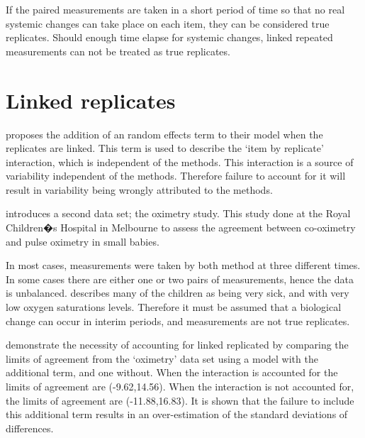 \documentclass[12pt, a4paper]{report}
\theoremstyle{plain}
\theoremstyle{definition}
\theoremstyle{remark}
\begin{document}
	If the paired measurements are taken
	in a short period of time so that no real systemic changes can take place on each item, they can be considered true replicates.
	Should enough time elapse for systemic changes, linked repeated measurements can not be treated as true replicates.
	
	
	
	\section{Linked replicates}
	
	\citet{BXC2008} proposes the addition of an random effects term to their model when the replicates are linked. This term is used to describe the `item by replicate' interaction, which is independent of the methods. This interaction is a source of variability independent of the methods. Therefore failure to account for it will result in variability being wrongly attributed to the methods.
	
	\citet{BXC2008} introduces a second data set; the oximetry study. This study done at the Royal Children�s Hospital in
	Melbourne to assess the agreement between co-oximetry and pulse oximetry in small babies.
	
	In most cases, measurements were taken by both method at three different times. In some cases there are either one or two pairs of measurements, hence the data is unbalanced. \citet{BXC2008} describes many of the children as being very sick, and with very low oxygen saturations levels. Therefore it must be assumed that a biological change can occur in interim periods, and measurements are not true replicates.
	
	\citet{BXC2008} demonstrate the necessity of accounting for linked replicated by comparing the limits of agreement from the `oximetry' data set using a model with the additional term, and one without. When the interaction is accounted for the limits of agreement are (-9.62,14.56). When the interaction is not accounted for, the limits of agreement are (-11.88,16.83). It is shown that the failure to include this additional term results in an over-estimation of the standard deviations of differences.
	
\end{document}

